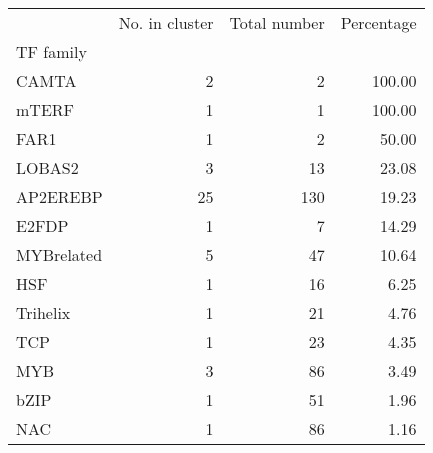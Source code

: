 \begin{tabular}{lrrr}
\toprule
{} &  No. in cluster &  Total number &  Percentage \\
TF family  &                 &               &             \\
\midrule
CAMTA      &               2 &             2 &      100.00 \\
mTERF      &               1 &             1 &      100.00 \\
FAR1       &               1 &             2 &       50.00 \\
LOBAS2     &               3 &            13 &       23.08 \\
AP2EREBP   &              25 &           130 &       19.23 \\
E2FDP      &               1 &             7 &       14.29 \\
MYBrelated &               5 &            47 &       10.64 \\
HSF        &               1 &            16 &        6.25 \\
Trihelix   &               1 &            21 &        4.76 \\
TCP        &               1 &            23 &        4.35 \\
MYB        &               3 &            86 &        3.49 \\
bZIP       &               1 &            51 &        1.96 \\
NAC        &               1 &            86 &        1.16 \\
\bottomrule
\end{tabular}
